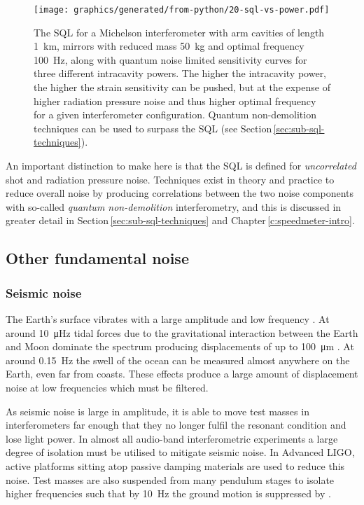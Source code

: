 \begin{figure}
  \centering
  \texttt{[image: graphics/generated/from-python/20-sql-vs-power.pdf]}
  \caption[Standard quantum limit and the quantum noise with various input powers]{\label{fig:sql-vs-input-power}The \gls{SQL} for a Michelson interferometer with arm cavities of length \SI{1}{\kilo\meter}, mirrors with reduced mass \SI{50}{\kilo\gram} and optimal frequency \SI{100}{\hertz}, along with quantum noise limited sensitivity curves for three different intracavity powers. The higher the intracavity power, the higher the strain sensitivity can be pushed, but at the expense of higher radiation pressure noise and thus higher optimal frequency for a given interferometer configuration. Quantum non-demolition techniques can be used to surpass the \gls{SQL} (see Section\,\ref{sec:sub-sql-techniques}).}
\end{figure}

An important distinction to make here is that the \gls{SQL} is defined for \emph{uncorrelated} shot and radiation pressure noise. Techniques exist in theory and practice to reduce overall noise by producing correlations between the two noise components with so-called \emph{quantum non-demolition} interferometry, and this is discussed in greater detail in Section\,\ref{sec:sub-sql-techniques} and Chapter\,\ref{c:speedmeter-intro}.

\subsection{Other fundamental noise}

\subsubsection{\label{sec:seismic-noise}Seismic noise}
The Earth's surface vibrates with a large amplitude and low frequency \cite{ET2011}. At around \SI{10}{\micro\hertz} tidal forces due to the gravitational interaction between the Earth and Moon dominate the spectrum producing displacements of up to \SI{100}{\micro\meter} \cite{Adhikari2004}. At around \SI{0.15}{\hertz} the swell of the ocean can be measured almost anywhere on the Earth, even far from coasts. These effects produce a large amount of displacement noise at low frequencies which must be filtered.

As seismic noise is large in amplitude, it is able to move test masses in interferometers far enough that they no longer fulfil the resonant condition and lose light power. In almost all audio-band interferometric experiments a large degree of isolation must be utilised to mitigate seismic noise. In Advanced \gls{LIGO}, active platforms sitting atop passive damping materials are used to reduce this noise. Test masses are also suspended from many pendulum stages to isolate higher frequencies such that by \SI{10}{\hertz} the ground motion is suppressed by .

